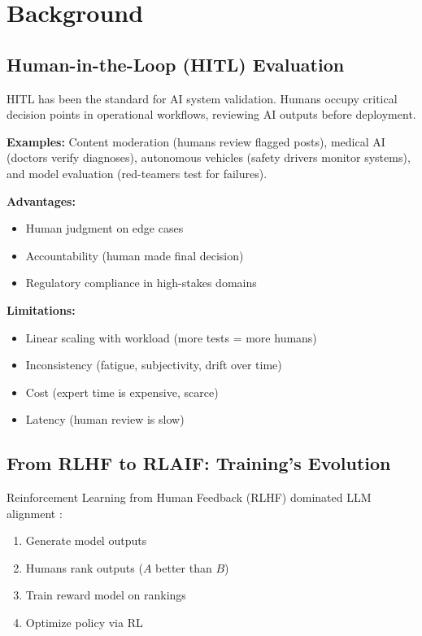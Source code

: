 \documentclass[11pt]{article}
\begin{document}
\section{Background}
\label{sec:background}

\subsection{Human-in-the-Loop (HITL) Evaluation}

HITL has been the standard for AI system validation. Humans occupy critical decision points in operational workflows, reviewing AI outputs before deployment.

\textbf{Examples:} Content moderation (humans review flagged posts), medical AI (doctors verify diagnoses), autonomous vehicles (safety drivers monitor systems), and model evaluation (red-teamers test for failures).

\textbf{Advantages:}
\begin{itemize}[nosep]
  \item Human judgment on edge cases
  \item Accountability (human made final decision)
  \item Regulatory compliance in high-stakes domains
\end{itemize}

\textbf{Limitations:}
\begin{itemize}[nosep]
  \item Linear scaling with workload (more tests = more humans)
  \item Inconsistency (fatigue, subjectivity, drift over time)
  \item Cost (expert time is expensive, scarce)
  \item Latency (human review is slow)
\end{itemize}

\subsection{From RLHF to RLAIF: Training's Evolution}

Reinforcement Learning from Human Feedback (RLHF) dominated LLM alignment \citep{christiano2017deep,ouyang2022training}:
\begin{enumerate}[nosep]
  \item Generate model outputs
  \item Humans rank outputs ($A$ better than $B$)
  \item Train reward model on rankings
  \item Optimize policy via RL
\end{enumerate}
\end{document}

